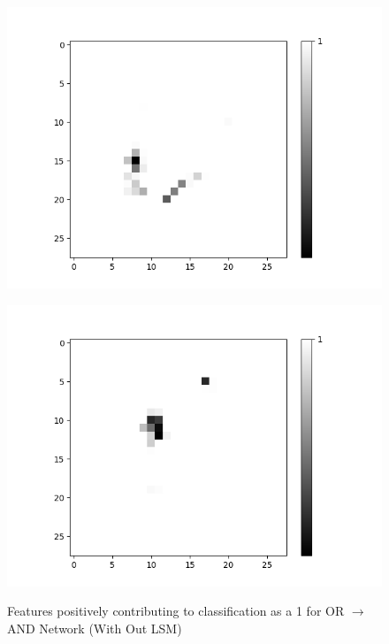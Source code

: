 \begin{figure}[H]
\begin{minipage}[b]{0.19\textwidth}
		\includegraphics[width=\textwidth]{OR-AND(WO-LSM)(1)/Like/False/Layer0-Neuron-10.png}
		\label{}
	\end{minipage}
	\begin{minipage}[b]{0.19\textwidth}
		\captionsetup{labelformat=empty}
		\includegraphics[width=\textwidth]{OR-AND(WO-LSM)(1)/Like/False/Layer0-Neuron-15.png}
		\label{}
	\end{minipage}
	\caption{Features positively contributing to classification as a 1 for OR $\rightarrow$ AND Network (With Out LSM)}
	\label{fig:or-and-net-without-lsm-pos}
	\hfill
\end{figure}


